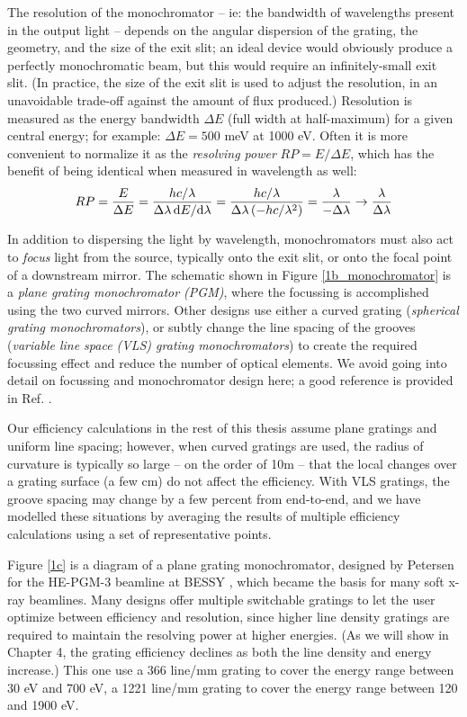 The resolution of the monochromator  -- ie: the bandwidth of wavelengths present in the output light -- depends on the angular dispersion of the grating, the geometry, and the size of the exit slit; an ideal device would obviously produce a perfectly monochromatic beam, but this would require an infinitely-small exit slit.  (In practice, the size of the exit slit is used to adjust the resolution, in an unavoidable trade-off against the amount of flux produced.)  Resolution is measured as the energy bandwidth $\Delta E$ (full width at half-maximum) for a given central energy; for example: $\Delta E = 500$ meV at 1000 eV.   Often it is more convenient to normalize it as the \emph{resolving power} $RP = E/\Delta E$, which has the benefit of being identical when measured in wavelength as well:
\begin{eqnarray}
RP = \frac{E}{\Delta E} = \frac{hc/\lambda}{\Delta \lambda \, \mathrm{d} E/\mathrm{d} \lambda} = \frac{hc/\lambda}{\Delta \lambda\, (-hc / \lambda^2)} =  \frac{\lambda}{-\Delta \lambda} \rightarrow \frac{\lambda}{\Delta \lambda}
\end{eqnarray}

In addition to dispersing the light by wavelength, monochromators must also act to \emph{focus} light from the source, typically onto the exit slit, or onto the focal point of a downstream mirror.  The schematic shown in Figure \ref{1b_monochromator} is a \emph{plane grating monochromator (PGM)}, where the focussing is accomplished using the two curved mirrors.  Other designs use either a curved grating (\emph{spherical grating monochromators}), or subtly change the line spacing of the grooves (\emph{variable line space (VLS) grating monochromators}) to create the required focussing effect and reduce the number of optical elements.  We avoid going into detail on focussing and monochromator design here; a good reference is provided in Ref. \cite{Pea97}.

Our efficiency calculations in the rest of this thesis assume plane gratings and uniform line spacing; however, when curved gratings are used, the radius of curvature is typically so large  -- on the order of 10m -- that the local changes over a grating surface (a few cm) do not affect the efficiency.  With VLS gratings, the groove spacing may change by a few percent from end-to-end, and we have modelled these situations by averaging the results of multiple efficiency calculations using a set of representative points.

Figure \ref{1c} is a diagram of a plane grating monochromator, designed by Petersen  for the HE-PGM-3 beamline at BESSY \cite{Pet95}, which became the basis for many soft x-ray beamlines.   Many designs offer multiple switchable gratings to let the user optimize between efficiency and resolution, since higher line density gratings are required to maintain the resolving power at higher energies.  (As we will show in Chapter 4, the grating efficiency declines as both the line density and energy increase.)  This one use a 366 line/mm grating to cover the energy range between 30 eV and 700 eV, a 1221 line/mm grating to cover the energy range between 120 and 1900 eV.

